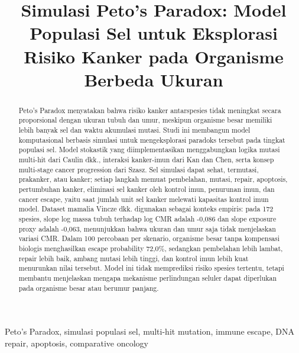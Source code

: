 \documentclass[conference]{IEEEtran}
\begin{document}
\title{Simulasi Peto's Paradox: Model Populasi Sel untuk Eksplorasi Risiko Kanker pada Organisme Berbeda Ukuran}

\author{
}

\maketitle

\begin{abstract}
Peto's Paradox menyatakan bahwa risiko kanker antarspesies tidak meningkat
secara proporsional dengan ukuran tubuh dan umur, meskipun organisme besar
memiliki lebih banyak sel dan waktu akumulasi mutasi. Studi ini membangun
model komputasional berbasis simulasi untuk mengeksplorasi paradoks tersebut
pada tingkat populasi sel. Model stokastik yang diimplementasikan
menggabungkan logika mutasi multi-hit dari Caulin dkk., interaksi kanker-imun
dari Kan dan Chen, serta konsep multi-stage cancer progression dari Szasz. Sel
simulasi dapat sehat, termutasi, prakanker, atau kanker; setiap langkah
memuat pembelahan, mutasi, repair, apoptosis, pertumbuhan kanker, eliminasi sel
kanker oleh kontrol imun, penurunan imun, dan cancer escape, yaitu saat jumlah
unit sel kanker melewati kapasitas kontrol imun model. Dataset mamalia Vincze dkk.
digunakan sebagai konteks empiris: pada 172 spesies, slope log massa tubuh
terhadap log CMR adalah -0{,}086 dan slope exposure proxy adalah -0{,}063,
menunjukkan bahwa ukuran dan umur saja tidak menjelaskan variasi CMR. Dalam
100 percobaan per skenario, organisme besar tanpa kompensasi biologis menghasilkan escape
probability 72{,}0\%, sedangkan pembelahan lebih lambat, repair lebih baik,
ambang mutasi lebih tinggi, dan kontrol imun lebih kuat menurunkan nilai
tersebut. Model ini tidak memprediksi risiko spesies tertentu, tetapi membantu
menjelaskan mengapa mekanisme perlindungan seluler dapat diperlukan pada
organisme besar atau berumur panjang.
\end{abstract}

\begin{IEEEkeywords}
Peto's Paradox, simulasi populasi sel, multi-hit mutation, immune escape,
DNA repair, apoptosis, comparative oncology
\end{IEEEkeywords}









\end{document}
